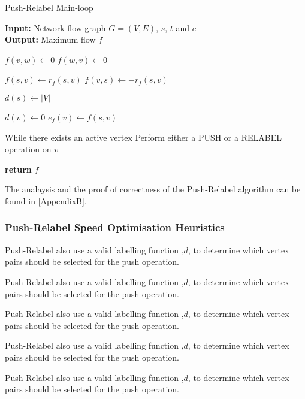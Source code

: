 \begin{algorithm}
	\caption{Push-Relabel Main-loop}\label{alg:main_no_optimisation}
	\textbf{Input:} Network flow graph $G=(V,E)$, $s$, $t$ and $c$\\
	\textbf{Output:} Maximum flow $f$
	\begin{algorithmic}[1]
		\State $f(v,w) \gets 0$
		\State $f(w,v) \gets 0$
		\EndFor
		\item[]
		\State $f(s,v) \gets r_f(s,v)$
		\State $f(v,s) \gets -r_f(s,v)$
		\EndFor
		\item[]
		\State $d(s) \gets |V|$
		\item[]
		\State $d(v) \gets 0$
		\State $e_f(v) \gets f(s,v)$
		\EndFor
		\item[]
		\State While there exists an active vertex
		 
		\State Perform either a PUSH or a RELABEL operation on $v$
		\EndWhile
		\item[]
		\State \textbf{return} $f$
		\EndProcedure
	\end{algorithmic}
\end{algorithm}

The analaysis and the proof of correctness of the Push-Relabel algorithm can be found in \autoref{AppendixB}.


\subsubsection{Push-Relabel Speed Optimisation Heuristics}
\begin{definition}[Discharge]
	Push-Relabel also use a valid labelling function ,$d$, to determine which vertex pairs should be selected for the push operation.
\end{definition}

\begin{definition}[FIFO]
	Push-Relabel also use a valid labelling function ,$d$, to determine which vertex pairs should be selected for the push operation.
\end{definition}

\begin{definition}
	Push-Relabel also use a valid labelling function ,$d$, to determine which vertex pairs should be selected for the push operation.
\end{definition}

\begin{definition}
	Push-Relabel also use a valid labelling function ,$d$, to determine which vertex pairs should be selected for the push operation.
\end{definition}

\begin{definition}
	Push-Relabel also use a valid labelling function ,$d$, to determine which vertex pairs should be selected for the push operation.
\end{definition}
